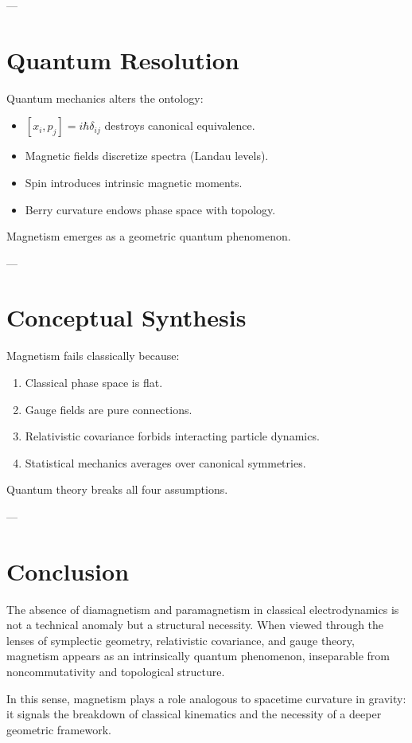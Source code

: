 \documentclass[11pt]{article}
\begin{document}
---

\section{Quantum Resolution}

Quantum mechanics alters the ontology:

\begin{itemize}
\item $[x_i,p_j]=i\hbar\delta_{ij}$ destroys canonical equivalence.
\item Magnetic fields discretize spectra (Landau levels).
\item Spin introduces intrinsic magnetic moments.
\item Berry curvature endows phase space with topology.
\end{itemize}

Magnetism emerges as a geometric quantum phenomenon.

---

\section{Conceptual Synthesis}

Magnetism fails classically because:
\begin{enumerate}
\item Classical phase space is flat.
\item Gauge fields are pure connections.
\item Relativistic covariance forbids interacting particle dynamics.
\item Statistical mechanics averages over canonical symmetries.
\end{enumerate}

Quantum theory breaks all four assumptions.

---

\section{Conclusion}

The absence of diamagnetism and paramagnetism in classical electrodynamics is not a technical anomaly but a structural necessity. When viewed through the lenses of symplectic geometry, relativistic covariance, and gauge theory, magnetism appears as an intrinsically quantum phenomenon, inseparable from noncommutativity and topological structure.

In this sense, magnetism plays a role analogous to spacetime curvature in gravity: it signals the breakdown of classical kinematics and the necessity of a deeper geometric framework.
\end{document}

